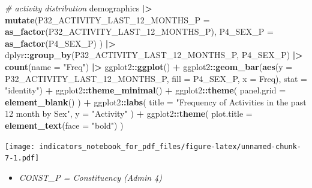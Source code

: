 \documentclass[
]{article}
\newenvironment{Shaded}{\begin{snugshade}}{\end{snugshade}}
\newcommand{\AttributeTok}[1]{\textcolor[rgb]{0.13,0.29,0.53}{#1}}
\newcommand{\CommentTok}[1]{\textcolor[rgb]{0.56,0.35,0.01}{\textit{#1}}}
\newcommand{\FunctionTok}[1]{\textcolor[rgb]{0.13,0.29,0.53}{\textbf{#1}}}
\newcommand{\NormalTok}[1]{#1}
\newcommand{\SpecialCharTok}[1]{\textcolor[rgb]{0.81,0.36,0.00}{\textbf{#1}}}
\newcommand{\StringTok}[1]{\textcolor[rgb]{0.31,0.60,0.02}{#1}}
\providecommand{\tightlist}{%
  \setlength{\itemsep}{0pt}\setlength{\parskip}{0pt}}
\newenvironment{UNFPAShadedBox}{%
\begin{tcolorbox}[sharp corners, enhanced, colback=white, boxrule=0pt, borderline west={2pt}{0pt}{orange}]%
}{\end{tcolorbox}}
\newenvironment{Highlighting}{\begin{UNFPAShadedBox}}{\end{UNFPAShadedBox}}
\begin{document}
\begin{Shaded}
\begin{Highlighting}[]
\CommentTok{\# activity distribution}
\NormalTok{demographics }\SpecialCharTok{|\textgreater{}}
  \FunctionTok{mutate}\NormalTok{(}\AttributeTok{P32\_ACTIVITY\_LAST\_12\_MONTHS\_P =} \FunctionTok{as\_factor}\NormalTok{(P32\_ACTIVITY\_LAST\_12\_MONTHS\_P),}
         \AttributeTok{P4\_SEX\_P =} \FunctionTok{as\_factor}\NormalTok{(P4\_SEX\_P)}
\NormalTok{         ) }\SpecialCharTok{|\textgreater{}}
\NormalTok{  dplyr}\SpecialCharTok{::}\FunctionTok{group\_by}\NormalTok{(P32\_ACTIVITY\_LAST\_12\_MONTHS\_P, P4\_SEX\_P) }\SpecialCharTok{|\textgreater{}}
  \FunctionTok{count}\NormalTok{(}\AttributeTok{name =} \StringTok{"Freq"}\NormalTok{) }\SpecialCharTok{|\textgreater{}}
\NormalTok{  ggplot2}\SpecialCharTok{::}\FunctionTok{ggplot}\NormalTok{() }\SpecialCharTok{+}
\NormalTok{  ggplot2}\SpecialCharTok{::}\FunctionTok{geom\_bar}\NormalTok{(}\FunctionTok{aes}\NormalTok{(}\AttributeTok{y =}\NormalTok{ P32\_ACTIVITY\_LAST\_12\_MONTHS\_P, }
                        \AttributeTok{fill =}\NormalTok{ P4\_SEX\_P, }
                        \AttributeTok{x =}\NormalTok{ Freq), }
                    \AttributeTok{stat =} \StringTok{"identity"}\NormalTok{) }\SpecialCharTok{+}
\NormalTok{  ggplot2}\SpecialCharTok{::}\FunctionTok{theme\_minimal}\NormalTok{() }\SpecialCharTok{+}
\NormalTok{  ggplot2}\SpecialCharTok{::}\FunctionTok{theme}\NormalTok{(}
    \AttributeTok{panel.grid =} \FunctionTok{element\_blank}\NormalTok{()}
\NormalTok{  ) }\SpecialCharTok{+}
\NormalTok{  ggplot2}\SpecialCharTok{::}\FunctionTok{labs}\NormalTok{(}
    \AttributeTok{title =} \StringTok{"Frequency of Activities in the past 12 month by Sex"}\NormalTok{,}
    \AttributeTok{y =} \StringTok{"Activity"}
\NormalTok{  ) }\SpecialCharTok{+}
\NormalTok{  ggplot2}\SpecialCharTok{::}\FunctionTok{theme}\NormalTok{(}
    \AttributeTok{plot.title =} \FunctionTok{element\_text}\NormalTok{(}\AttributeTok{face =} \StringTok{"bold"}\NormalTok{)}
\NormalTok{  )}
\end{Highlighting}
\end{Shaded}

\texttt{[image: indicators\_notebook\_for\_pdf\_files/figure-latex/unnamed-chunk-7-1.pdf]}

\begin{itemize}
\tightlist
\item
  \emph{CONST\_P = Constituency (Admin 4)}
\end{itemize}
\end{document}
